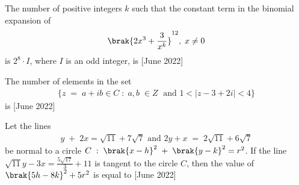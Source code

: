  \bigskip
 \item The number of positive integers $k$ such that the constant term in the binomial expansion of
 \begin{align*}
 \brak{2x^3+\frac{3}{x^k}}^{12},\;x\neq0
 \end{align*}
 is $2^8\cdot I$, where $I$ is an odd integer, is \hfill{[June 2022]}
 \bigskip
 \item The number of elements in the set 
 \begin{align*}
 \{z\;=\;a+ib \in C\; : \; a,b\;\in Z\;\text{ and } 1<|z-3+2i|<4\}
 \end{align*}
 is \hfill{[June 2022]}
 \bigskip
 \item Let the lines 
 \begin{align*}
 y\;+\;2x=\sqrt{11}+7\sqrt{7}\text{ and } 2y+x\;=\;2\sqrt{11}+6\sqrt{7}
 \end{align*}
 be normal to a circle $C\; :\;\brak{x-h}^2\;+\;\brak{y-k}^2=r^2$. If the line $\sqrt{11}y-3x=\frac{5\sqrt{17}}{3}+11$ is tangent to the circle $C$, then the value of $\brak{5h-8k}^2+5r^2$ is equal to \hfill{[June 2022]}
